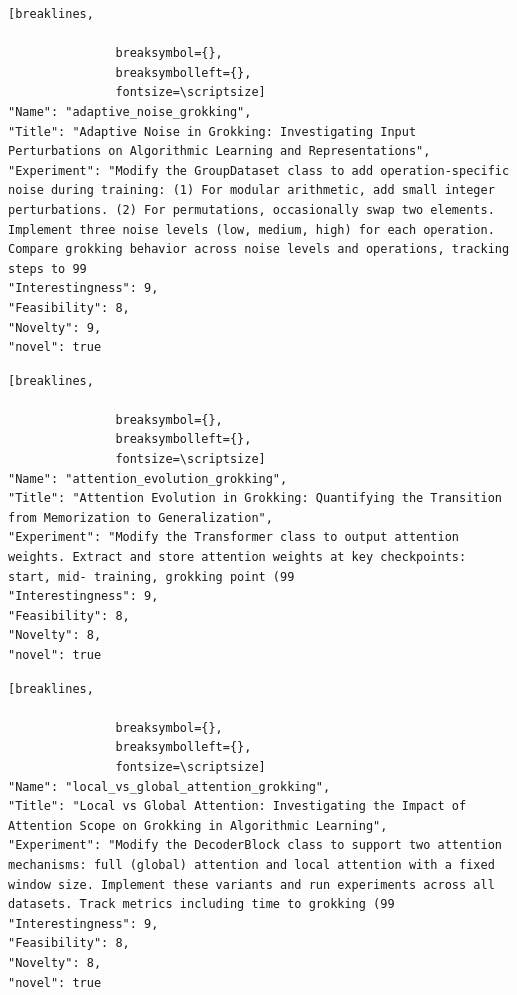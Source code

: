 \begin{tcolorbox}[
  breakable,
  colback  = blue!5!white,
  colframe = blue!75!black,
  title    = {Idea 4/50 - \texttt{adaptive\_noise\_grokking}},
  fontupper=\scriptsize\ttfamily,
]
\begin{Verbatim}[breaklines,

               breaksymbol={},
               breaksymbolleft={},
               fontsize=\scriptsize]
"Name": "adaptive_noise_grokking",
"Title": "Adaptive Noise in Grokking: Investigating Input Perturbations on Algorithmic Learning and Representations",
"Experiment": "Modify the GroupDataset class to add operation-specific noise during training: (1) For modular arithmetic, add small integer perturbations. (2) For permutations, occasionally swap two elements. Implement three noise levels (low, medium, high) for each operation. Compare grokking behavior across noise levels and operations, tracking steps to 99
"Interestingness": 9,
"Feasibility": 8,
"Novelty": 9,
"novel": true
\end{Verbatim}
\end{tcolorbox}

\begin{tcolorbox}[
  breakable,
  colback  = blue!5!white,
  colframe = blue!75!black,
  title    = {Idea 5/50 - \texttt{attention\_evolution\_grokking}},
  fontupper=\scriptsize\ttfamily,
]
\begin{Verbatim}[breaklines,

               breaksymbol={},
               breaksymbolleft={},
               fontsize=\scriptsize]
"Name": "attention_evolution_grokking",
"Title": "Attention Evolution in Grokking: Quantifying the Transition from Memorization to Generalization",
"Experiment": "Modify the Transformer class to output attention weights. Extract and store attention weights at key checkpoints: start, mid- training, grokking point (99
"Interestingness": 9,
"Feasibility": 8,
"Novelty": 8,
"novel": true
\end{Verbatim}
\end{tcolorbox}

\begin{tcolorbox}[
  breakable,
  colback  = blue!5!white,
  colframe = blue!75!black,
  title    = {Idea 6/50 - \texttt{local\_vs\_global\_attention\_grokking}},
  fontupper=\scriptsize\ttfamily,
]
\begin{Verbatim}[breaklines,

               breaksymbol={},
               breaksymbolleft={},
               fontsize=\scriptsize]
"Name": "local_vs_global_attention_grokking",
"Title": "Local vs Global Attention: Investigating the Impact of Attention Scope on Grokking in Algorithmic Learning",
"Experiment": "Modify the DecoderBlock class to support two attention mechanisms: full (global) attention and local attention with a fixed window size. Implement these variants and run experiments across all datasets. Track metrics including time to grokking (99
"Interestingness": 9,
"Feasibility": 8,
"Novelty": 8,
"novel": true
\end{Verbatim}
\end{tcolorbox}

